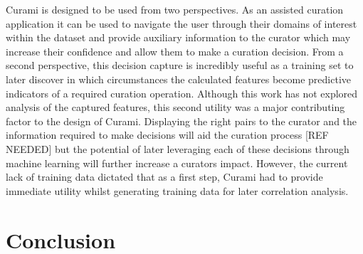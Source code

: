 \documentclass{bmcart}
\begin{document}

Curami is designed to be used from two perspectives. As an assisted curation application it can be used to navigate the user through their domains of interest within the dataset and provide auxiliary information to the curator which may increase their confidence and allow them to make a curation decision. From a second perspective, this decision capture is incredibly useful as a training set to later discover in which circumstances the calculated features become predictive indicators of a required curation operation. Although this work has not explored analysis of the captured features, this second utility was a major contributing factor to the design of Curami. Displaying the right pairs to the curator and the information required to make decisions will aid the curation process [REF NEEDED] but the potential of later leveraging each of these decisions through machine learning will further increase a curators impact. However, the current lack of training data dictated that as a first step, Curami had to provide immediate utility whilst generating training data for later correlation analysis.



\section*{Conclusion}


\end{document}
